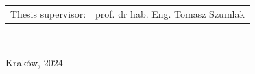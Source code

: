 \begin{titlepage}
{\begin{tabular}{ll}
Thesis supervisor: & prof. dr hab. Eng. Tomasz Szumlak\\
\end{tabular}
}\\[10mm]
\begin{center}
{\sf Kraków, 2024}
\end{center}

\newpage
\end{titlepage}